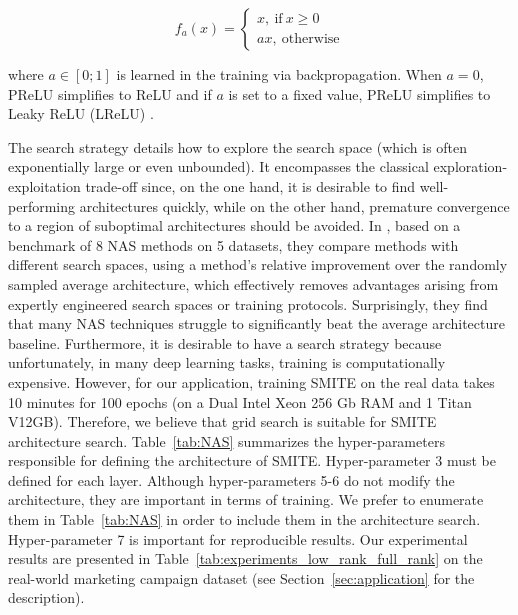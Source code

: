 \[
f_a (x) = 
\begin{cases}
    x, ~\mathrm{if}~ x \geq 0\\
    ax, ~\mathrm{otherwise}
\end{cases}
\]

where $a \in [0;1]$ is learned in the training via backpropagation. When $a=0$, PReLU simplifies to ReLU and if $a$ is set to a fixed value, PReLU simplifies to Leaky ReLU (LReLU)  \citep{maas2013rectifier}.


The search strategy details how to explore the search space
(which is often exponentially large or even unbounded). It encompasses the classical exploration-exploitation trade-off since, on the one hand, it is desirable to find well-performing architectures quickly, while on the other hand, premature convergence to a region of suboptimal architectures should be avoided. In \cite{yang2019evaluation},  based on a benchmark of 8 NAS methods on 5 datasets, they compare methods with different search spaces, using a method’s relative improvement over the randomly sampled average architecture, which effectively removes advantages arising from expertly engineered search spaces or training protocols. Surprisingly, they find that many NAS techniques struggle to significantly beat the average architecture baseline. Furthermore, it is desirable to have a search strategy because unfortunately, in many deep learning tasks, training is computationally expensive. However, for our application, training SMITE on the real data takes 10 minutes for 100 epochs (on a Dual Intel Xeon 256 Gb RAM and 1 Titan V12GB). Therefore, we believe that grid search is suitable for SMITE architecture search. Table~\ref{tab:NAS} summarizes the hyper-parameters responsible for defining the architecture of SMITE. Hyper-parameter 3 must be defined for each layer. Although hyper-parameters 5-6 do not modify the architecture, they are important in terms of training. We prefer to enumerate them in Table~\ref{tab:NAS} in order to include them in the architecture search. Hyper-parameter 7 is important for reproducible results. Our experimental results are presented in Table~\ref{tab:experiments_low_rank_full_rank} on the real-world marketing campaign dataset (see Section~\ref{sec:application} for the description).

